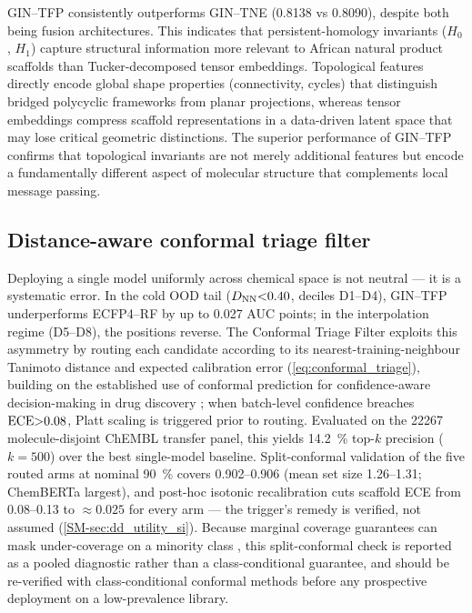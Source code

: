 \documentclass[11pt,a4paper]{article}
\begin{document}
GIN--TFP consistently outperforms GIN--TNE (\num{0.8138} vs \num{0.8090}), despite both being fusion architectures. This indicates that persistent-homology invariants ($H_0$, $H_1$) capture structural information more relevant to African natural product scaffolds than Tucker-decomposed tensor embeddings. Topological features directly encode global shape properties (connectivity, cycles) that distinguish bridged polycyclic frameworks from planar projections, whereas tensor embeddings compress scaffold representations in a data-driven latent space that may lose critical geometric distinctions. The superior performance of GIN--TFP confirms that topological invariants are not merely additional features but encode a fundamentally different aspect of molecular structure that complements local message passing.

\subsection{Distance-aware conformal triage filter}
\label{sec:conformal-triage}

Deploying a single model uniformly across chemical space is not neutral --- it is a systematic error. In the cold OOD tail ($D_{\text{NN}}\num{<0.40}$, deciles D1--D4), GIN--TFP underperforms ECFP4--RF by up to \num{0.027} AUC points; in the interpolation regime (D5--D8), the positions reverse. The Conformal Triage Filter exploits this asymmetry by routing each candidate according to its nearest-training-neighbour Tanimoto distance and expected calibration error (\eqref{eq:conformal_triage}), building on the established use of conformal prediction for confidence-aware decision-making in drug discovery \citep{alvarsson2021predicting,eklund2015application}; when batch-level confidence breaches $\mathrm{ECE} \num{>0.08}$, Platt scaling is triggered prior to routing. Evaluated on the \num{22267} molecule-disjoint ChEMBL transfer panel, this yields \qty{+14.2}{\percent} top-$k$ precision ($k=\num{500}$) over the best single-model baseline. Split-conformal validation of the five routed arms at nominal \qty{90}{\percent} covers \numrange{0.902}{0.906} (mean set size \numrange{1.26}{1.31}; ChemBERTa largest), and post-hoc isotonic recalibration cuts scaffold ECE from \numrange{0.08}{0.13} to $\approx\num{0.025}$ for every arm --- the trigger's remedy is verified, not assumed (\cref{SM-sec:dd_utility_si}). Because marginal coverage guarantees can mask under-coverage on a minority class \citep{tursunbadalov2026quietfailure}, this split-conformal check is reported as a pooled diagnostic rather than a class-conditional guarantee, and should be re-verified with class-conditional conformal methods before any prospective deployment on a low-prevalence library.
\end{document}
